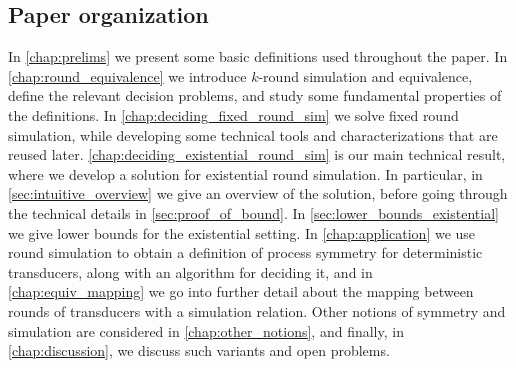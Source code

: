 \subsection*{Paper organization}
In \autoref{chap:prelims} we present some basic definitions used throughout the paper. In \autoref{chap:round_equivalence} we introduce $k$-round simulation and equivalence, define the relevant decision problems, and study some fundamental properties of the definitions. In \autoref{chap:deciding_fixed_round_sim} we solve fixed round simulation, while developing some technical tools and characterizations that are reused later. \autoref{chap:deciding_existential_round_sim} is our main technical result, where we develop a solution for existential round simulation. In particular, in \autoref{sec:intuitive_overview} we give an overview of the solution, before going through the technical details in \autoref{sec:proof_of_bound}. In \autoref{sec:lower_bounds_existential} we give lower bounds for the existential setting.
In \autoref{chap:application} we use round simulation to obtain a definition of process symmetry for deterministic transducers, along with an algorithm for deciding it, and in \autoref{chap:equiv_mapping} we go into further detail about the mapping between rounds of transducers with a simulation relation. Other notions of symmetry and simulation are considered in \autoref{chap:other_notions}, and finally, in \autoref{chap:discussion}, we discuss such variants and open problems.
